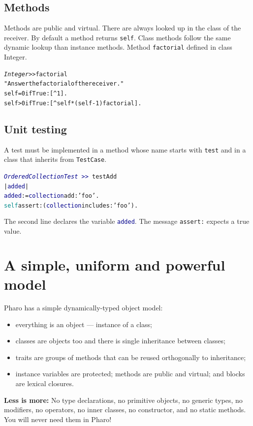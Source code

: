 \documentclass[notumble]{leaflet}
\makeatletter
\newcommand{\ct}[1]{{\textsf{#1}}\xspace}
\newenvironment{displaycode}{%
     \par
     \hspace{1.5em}\begin{minipage}{\linewidth}
       \begin{alltt}\small}{
       \end{alltt}
     \end{minipage}
     \par}
\newcommand{\code}[1]{\foreignlanguage{english}{\texttt{#1}}}
\makeatother
\begin{document}
\subsection{Methods}
Methods are public and virtual. There are always looked up in the class of the receiver. By default a method returns \code{self}. 
Class methods follow the same dynamic lookup than instance methods. 
Method \code{factorial} defined in class \ct{Integer}. 

\begin{displaycode}
\textit{Integer >>} factorial
   "Answer the factorial of the receiver."
   self = 0 ifTrue: [^ 1].
   self > 0 ifTrue: [^ self * (self - 1) factorial].
\end{displaycode}



\vspace{-0.3cm}
\subsection{Unit testing}
A test must be implemented in a method whose name starts with \code{test} and in a class that
inherits from \code{TestCase}.

\begin{displaycode}
\textcolor{darkBlue}{\textit{OrderedCollectionTest}\,>>}\,testAdd
  | \textcolor{darkBlue}{added} |
  \textcolor{darkBlue}{added} := \textcolor{darkBlue}{collection} add: \textcolor{string}{'foo'}.
  \textcolor{darkCyan}{self} assert: (\textcolor{darkBlue}{collection} includes: \textcolor{string}{'foo'}).
\end{displaycode}

The second line declares the variable \code{\textcolor{darkBlue}{added}}. The message \code{assert:} expects a true value.
\vspace{-0.3cm}
\section{A simple, uniform and powerful model}

Pharo has a simple dynamically-typed object model:
\begin{itemize}
\item everything is an object --- instance of a class;
\item classes are objects too and there is single inheritance between classes;
\item traits are groups of methods that can be reused orthogonally to inheritance;
\item instance variables are protected; methods are public and virtual;
and blocks are lexical closures.
\end{itemize}

\textbf{Less is more:}  No type declarations, no primitive
objects, no generic types, no modifiers, no operators, no inner
classes, no constructor, and no static methods. You will never need them in
Pharo!



\end{document}
